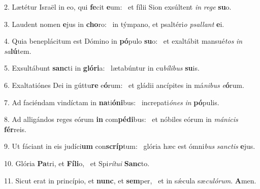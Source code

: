 2. Lætétur Israël in eo, qui \textbf{fe}cit \textbf{e}um: \ast\  et fílii Sion exsúltent \textit{in} \textit{re}\textit{ge} \textbf{su}o.\

3. Laudent nomen \textbf{e}jus in \textbf{cho}ro: \ast\  in týmpano, et psaltéri\textit{o} \textit{psal}\textit{lant} \textbf{e}i.\

4. Quia beneplácitum est Dómino in \textbf{pó}pulo \textbf{su}o: \ast\  et exaltábit mansué\textit{tos} \textit{in} \textit{sa}\textbf{lú}tem.\

5. Exsultábunt \textbf{sanc}ti in \textbf{gló}\textbf{ri}a: \ast\  lætabúntur in cu\textit{bí}\textit{li}\textit{bus} \textbf{su}is.\

6. Exaltatiónes Dei in gúttu\textbf{re} e\textbf{ó}rum: \ast\  et gládii ancípites in má\textit{ni}\textit{bus} \textit{e}\textbf{ó}rum.\

7. Ad faciéndam vindíctam in \textbf{na}ti\textbf{ó}\textbf{ni}bus: \ast\  increpati\textit{ó}\textit{nes} \textit{in} \textbf{pó}pulis.\

8. Ad alligándos reges eórum \textbf{in} com\textbf{pé}\textbf{di}bus: \ast\  et nóbiles eórum in \textit{má}\textit{ni}\textit{cis} \textbf{fér}reis.\

9. Ut fáciant in eis judíci\textbf{um} con\textbf{scríp}tum: \ast\  glória hæc est ómni\textit{bus} \textit{sanc}\textit{tis} \textbf{e}jus.\

10. Glória \textbf{Pa}tri, et \textbf{Fí}\textbf{li}o, \ast\  et Spi\textit{rí}\textit{tu}\textit{i} \textbf{Sanc}to.\

11. Sicut erat in princípio, et \textbf{nunc}, et \textbf{sem}per, \ast\  et in sǽcula sæ\textit{cu}\textit{ló}\textit{rum}. \textbf{A}men.\

